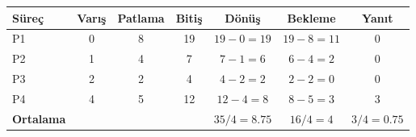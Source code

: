 \begin{tabular}{@{}lcccccc@{}}
\toprule
\textbf{Süreç} & \textbf{Varış} & \textbf{Patlama} & \textbf{Bitiş} & \textbf{Dönüş} & \textbf{Bekleme} & \textbf{Yanıt}\\
\midrule
P1 & 0 & 8 & 19 & $19-0=19$ & $19-8=11$ & 0\\
P2 & 1 & 4 & 7 & $7-1=6$ & $6-4=2$ & 0\\
P3 & 2 & 2 & 4 & $4-2=2$ & $2-2=0$ & 0\\
P4 & 4 & 5 & 12 & $12-4=8$ & $8-5=3$ & 3\\
\midrule
\textbf{Ortalama} &  &  &  & $35/4=8.75$ & $16/4=4$ & $3/4=0.75$\\
\bottomrule
\end{tabular}

